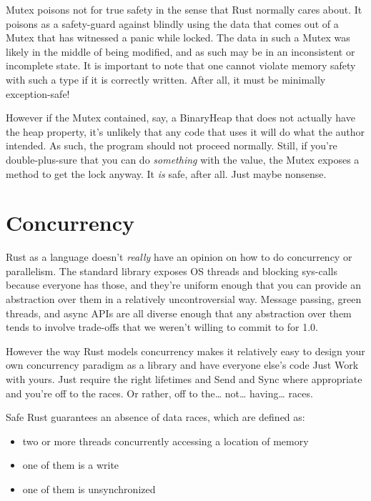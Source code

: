 \documentclass[a4paper,]{book}
\providecommand{\tightlist}{%
  \setlength{\itemsep}{0pt}\setlength{\parskip}{0pt}}
\begin{document}
Mutex poisons not for true safety in the sense that Rust normally cares
about. It poisons as a safety-guard against blindly using the data that
comes out of a Mutex that has witnessed a panic while locked. The data
in such a Mutex was likely in the middle of being modified, and as such
may be in an inconsistent or incomplete state. It is important to note
that one cannot violate memory safety with such a type if it is
correctly written. After all, it must be minimally exception-safe!

However if the Mutex contained, say, a BinaryHeap that does not actually
have the heap property, it's unlikely that any code that uses it will do
what the author intended. As such, the program should not proceed
normally. Still, if you're double-plus-sure that you can do
\emph{something} with the value, the Mutex exposes a method to get the
lock anyway. It \emph{is} safe, after all. Just maybe nonsense.

\chapter{Concurrency}\label{sec--concurrency}

Rust as a language doesn't \emph{really} have an opinion on how to do
concurrency or parallelism. The standard library exposes OS threads and
blocking sys-calls because everyone has those, and they're uniform
enough that you can provide an abstraction over them in a relatively
uncontroversial way. Message passing, green threads, and async APIs are
all diverse enough that any abstraction over them tends to involve
trade-offs that we weren't willing to commit to for 1.0.

However the way Rust models concurrency makes it relatively easy to
design your own concurrency paradigm as a library and have everyone
else's code Just Work with yours. Just require the right lifetimes and
Send and Sync where appropriate and you're off to the races. Or rather,
off to the\ldots{} not\ldots{} having\ldots{} races.


Safe Rust guarantees an absence of data races, which are defined as:

\begin{itemize}
\tightlist
\item
  two or more threads concurrently accessing a location of memory
\item
  one of them is a write
\item
  one of them is unsynchronized
\end{itemize}
\end{document}
